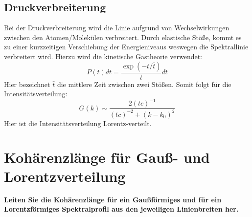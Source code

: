 \subsection{Druckverbreiterung}
Bei der Druckverbreiterung wird die Linie aufgrund von Wechselwirkungen zwischen den Atomen/Molekülen verbreitert.
Durch elastische Stöße, kommt es zu einer kurzzeitigen Verschiebung der Energieniveaus weswegen die Spektrallinie verbreitert wird.
Hierzu wird die kinetische Gastheorie verwendet:
\begin{equation}
    P(t) dt=\frac{\exp(-t/\bar{t})}{\bar{t}}dt
\end{equation}
Hier bezeichnet $\bar{t}$ die mittlere Zeit zwischen zwei Stößen.
Somit folgt für die Intensitätsverteilung:
\begin{equation}
    G(k)\sim\frac{2(tc)^{-1}}{(tc)^{-2}+\left(k-k_0\right)^2}
\end{equation}
Hier ist die Intensitätsverteilung Lorentz-verteilt.
\section{Kohärenzlänge für Gauß- und Lorentzverteilung}
\textbf{Leiten Sie die Kohärenzlänge für ein Gaußförmiges und für ein Lorentzförmiges Spektralprofil aus den jeweiligen Linienbreiten her.}
